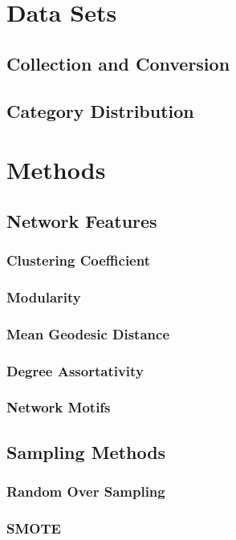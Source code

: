\documentclass{article}
\begin{document}
\section{Data Sets}
	\subsection{Collection and Conversion}
	\subsection{Category Distribution}

\section{Methods}
	\subsection{Network Features}
		\subsubsection{Clustering Coefficient}
		\subsubsection{Modularity}
		\subsubsection{Mean Geodesic Distance}
		\subsubsection{Degree Assortativity}
		\subsubsection{Network Motifs}

	\subsection{Sampling Methods}
		\subsubsection{Random Over Sampling}
		\subsubsection{SMOTE}
	
\end{document}
